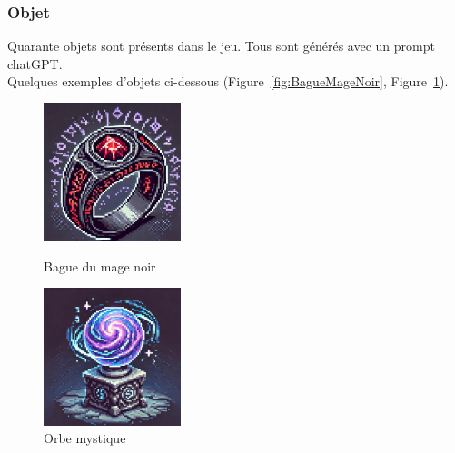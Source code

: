 \documentclass[11pt]{article}
\begin{document}
            \subsubsection{Objet}
            Quarante objets sont présents dans le jeu. Tous sont générés avec un prompt chatGPT.\\
            Quelques exemples d'objets ci-dessous (Figure~\ref{fig:BagueMageNoir}, Figure~\ref{fig:OrbeMystique}).
            \begin{figure}[H]
                \centering
                \begin{minipage}{0.45\textwidth}
                    \centering
                    \includegraphics[height=4cm]{Bague du mage noir.jpg}
                    \caption{Bague du mage noir}
                    \label{fig:BagueMageNoir}
                \end{minipage}
                \hfill
                \begin{minipage}{0.45\textwidth}
                    \centering
                    \includegraphics[height=4cm]{Orbe mystique.jpg}
                    \caption{Orbe mystique}
                    \label{fig:OrbeMystique}
                \end{minipage}
            \end{figure}
\end{document}
